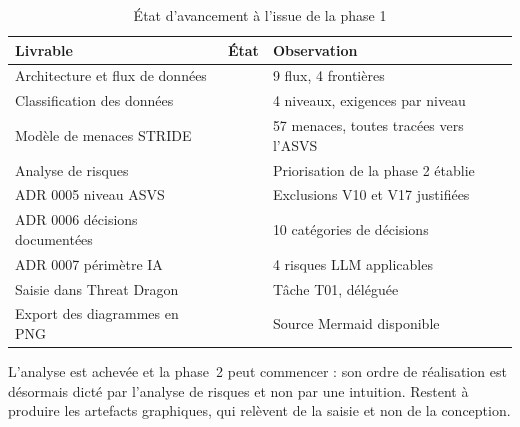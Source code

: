 \begin{table}[H]
\centering
\caption{État d'avancement à l'issue de la phase 1}
\label{tab:bilan-phase1}
\small
\begin{tabular}{@{}llp{6.4cm}@{}}
\toprule
\textbf{Livrable} & \textbf{État} & \textbf{Observation} \\
\midrule
Architecture et flux de données & \fait{} & 9 flux, 4 frontières \\
Classification des données      & \fait{} & 4 niveaux, exigences par niveau \\
Modèle de menaces STRIDE        & \fait{} & 57 menaces, toutes tracées vers l'ASVS \\
Analyse de risques              & \fait{} & Priorisation de la phase 2 établie \\
ADR 0005 niveau ASVS            & \fait{} & Exclusions V10 et V17 justifiées \\
ADR 0006 décisions documentées  & \fait{} & 10 catégories de décisions \\
ADR 0007 périmètre IA           & \fait{} & 4 risques LLM applicables \\
Saisie dans Threat Dragon       & \encours{} & Tâche T01, déléguée \\
Export des diagrammes en PNG    & \encours{} & Source Mermaid disponible \\
\bottomrule
\end{tabular}
\end{table}

L'analyse est achevée et la phase~2 peut commencer : son ordre de réalisation
est désormais dicté par l'analyse de risques et non par une intuition. Restent
à produire les artefacts graphiques, qui relèvent de la saisie et non de la
conception.
